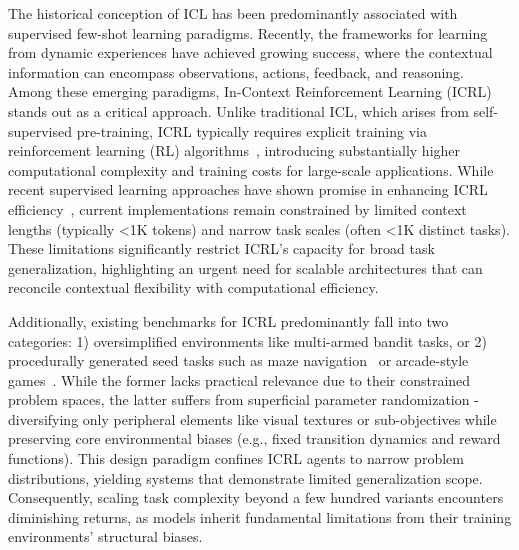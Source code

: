 \documentclass{article}
\renewcommand{\cite}[1]{\citep{#1}}
\begin{document}
The historical conception of ICL has been predominantly associated with supervised few-shot learning paradigms. Recently, the frameworks for learning from dynamic experiences have achieved growing success, where the contextual information can encompass observations, actions, feedback, and reasoning. Among these emerging paradigms, In-Context Reinforcement Learning (ICRL) stands out as a critical approach. Unlike traditional ICL, which arises from self-supervised pre-training, ICRL typically requires explicit training via reinforcement learning (RL) algorithms~\cite{duan2016rl}, introducing substantially higher computational complexity and training costs for large-scale applications. While recent supervised learning approaches have shown promise in enhancing ICRL efficiency~\cite{laskin2022context,zisman2023emergence,lee2024supervised}, current implementations remain constrained by limited context lengths (typically <1K tokens) and narrow task scales (often <1K distinct tasks). These limitations significantly restrict ICRL's capacity for broad task generalization, highlighting an urgent need for scalable architectures that can reconcile contextual flexibility with computational efficiency.

Additionally, existing benchmarks for ICRL predominantly fall into two categories: 1) oversimplified environments like multi-armed bandit tasks, or 2) procedurally generated seed tasks such as maze navigation~\cite{wang2022evolving, nikulin2023xland, morad2023popgym} or arcade-style games~\cite{cobbe2020leveraging}. While the former lacks practical relevance due to their constrained problem spaces, the latter suffers from superficial parameter randomization - diversifying only peripheral elements like visual textures or sub-objectives while preserving core environmental biases (e.g., fixed transition dynamics and reward functions). This design paradigm confines ICRL agents to narrow problem distributions, yielding systems that demonstrate limited generalization scope. Consequently, scaling task complexity beyond a few hundred variants encounters diminishing returns, as models inherit fundamental limitations from their training environments' structural biases.
\end{document}

